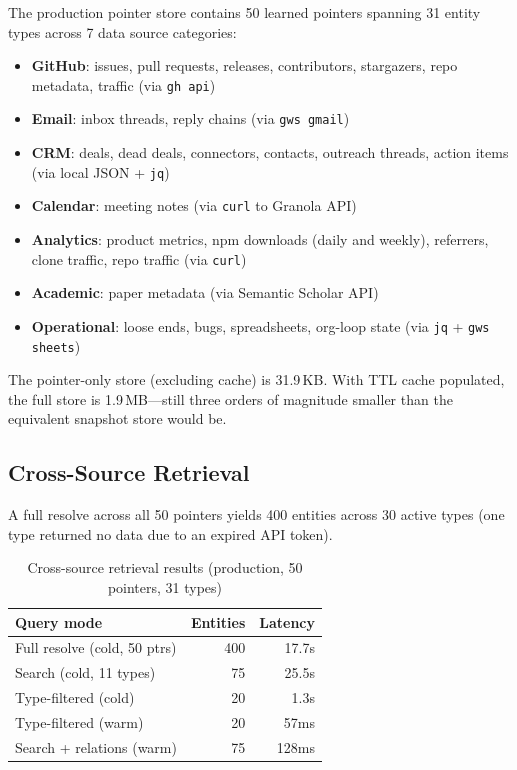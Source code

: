 \documentclass[11pt,twocolumn]{article}
\begin{document}
The production pointer store contains 50 learned pointers spanning 31 entity types across 7 data source categories:

\begin{itemize}[leftmargin=1.5em,itemsep=1pt]
  \item \textbf{GitHub}: issues, pull requests, releases, contributors, stargazers, repo metadata, traffic (via \texttt{gh api})
  \item \textbf{Email}: inbox threads, reply chains (via \texttt{gws gmail})
  \item \textbf{CRM}: deals, dead deals, connectors, contacts, outreach threads, action items (via local JSON + \texttt{jq})
  \item \textbf{Calendar}: meeting notes (via \texttt{curl} to Granola API)
  \item \textbf{Analytics}: product metrics, npm downloads (daily and weekly), referrers, clone traffic, repo traffic (via \texttt{curl})
  \item \textbf{Academic}: paper metadata (via Semantic Scholar API)
  \item \textbf{Operational}: loose ends, bugs, spreadsheets, org-loop state (via \texttt{jq} + \texttt{gws sheets})
\end{itemize}

The pointer-only store (excluding cache) is 31.9\,KB. With TTL cache populated, the full store is 1.9\,MB---still three orders of magnitude smaller than the equivalent snapshot store would be.

\subsection{Cross-Source Retrieval}

A full resolve across all 50 pointers yields 400 entities across 30 active types (one type returned no data due to an expired API token).

\begin{table}[t]
\centering\small
\caption{Cross-source retrieval results (production, 50 pointers, 31 types)}
\label{tab:retrieval}
\begin{tabular}{@{}lrr@{}}
\toprule
\textbf{Query mode} & \textbf{Entities} & \textbf{Latency} \\
\midrule
Full resolve (cold, 50 ptrs) & 400 & 17.7s \\
Search (cold, 11 types) & 75 & 25.5s \\
Type-filtered (cold) & 20 & 1.3s \\
Type-filtered (warm) & 20 & 57ms \\
Search + relations (warm) & 75 & 128ms \\
\bottomrule
\end{tabular}
\end{table}
\end{document}
